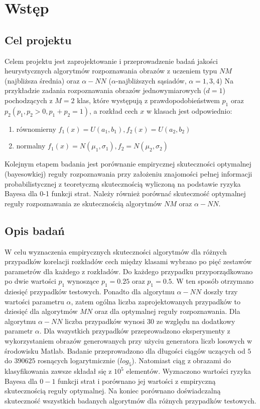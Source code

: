 \section{Wstęp}
	\subsection{Cel projektu}

	Celem projektu jest zaprojektowanie i przeprowadzenie badań jakości heurystycznych algorytmów rozpoznawania obrazów z uczeniem typu $NM$  (najbliższa średnia) oraz $\alpha-NN$ ($\alpha$-najbliższych sąsiadów, $ \alpha=1,3,4$) Na przykładzie zadania rozpoznawania obrazów jednowymiarowych ($d=1$) pochodzących z $M = 2$ klas, które występują z prawdopodobieństwem $p_1$ oraz $p_2 (p_1,p_2>0, p_1+p_2=1)$, a rozkład cech $x$ w klasach jest odpowiednio:
	\begin{enumerate}
	\item równomierny $f_1(x)=U(a_1,b_1), f_2(x)=U(a_2,b_2)$
	\item normalny $f_1(x)=N(\mu_1, \sigma_1), f_2=N(\mu_2, \sigma_2)$
	\end{enumerate}
	Kolejnym etapem badania jest porównanie empirycznej skuteczności optymalnej (bayesowkiej) reguły rozpoznawania przy założeniu znajomości pełnej informacji probabilistycznej z teoretyczną skutecznością wyliczoną na podstawie ryzyka Bayesa dla 0-1 funkcji strat. Należy również porównać skuteczność optymalnej reguły rozpoznawania ze skutecznością algorytmów $NM$ oraz $\alpha-NN$.
	
	\subsection{Opis badań}
	
	W celu wyznaczenia empirycznych skuteczności algorytmów dla różnych przypadków korelacji rozkładów cech między klasami wybrano po pięć zestawów parametrów dla każdego z rozkładów. Do każdego przypadku przyporządkowano po dwie wartości $p_1$ wynoszące $p_1=0.25$ oraz $p_1=0.5$. W ten sposób otrzymano dziesięć przypadków testowych. Ponadto dla algorytmu $\alpha-NN$ doszły trzy wartości parametru $\alpha$, zatem ogólna liczba zaprojektowanych przypadków to dziesięć dla algorytmów $MN$ oraz dla optymalnej reguły rozpoznawania. Dla algorytmu $\alpha-NN$ liczba przypadków wynosi 30 ze względu na dodatkowy parametr $\alpha$. \newline
	Dla wszystkich przypadków przeprowadzono eksperymenty z wykorzystaniem obrazów generowanych przy użyciu generatora liczb losowych w środowisku  Matlab. Badanie przeprowadzono dla długości ciągów uczących od $5$ do $390 625$ rosnących logarytmicznie ($log_5$). Natomiast ciąg z obrazami do klasyfikowania zawsze składał się z $10^5$ elementów.
	Wyznaczono wartości ryzyka Bayesa dla $0-1$ funkcji strat i porównano jej wartości z empiryczną skutecznością reguły optymalnej. \newline
	Na koniec porównano doświadczalną skuteczność wszystkich badanych algorytmów dla różnych przypadków testowych.
	
